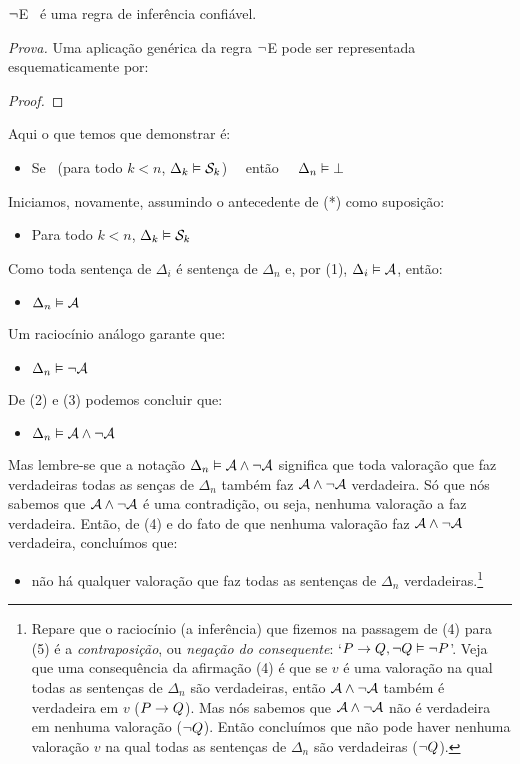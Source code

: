 \begin{factoidboxe}
	$\neg$E \ é uma regra de inferência confiável.
\end{factoidboxe}
\noindent\emph{Prova.}
Uma aplicação genérica da regra $\neg$E pode ser representada esquematicamente por:
\begin{proof}
\end{proof}\noindent
Aqui o que temos que demonstrar é:
\begin{itemize}
	\item[(*)]  Se  \ ({para todo}  $k<n$, $\Delta_k \vDash \mathcal{S}_k$) \ \ então \ \ $\Delta_n \vDash \bot$
\end{itemize}
Iniciamos, novamente, assumindo o antecedente de (*) como suposição:
\begin{itemize}
	\item[(1)] Para todo  $k<n$, $\Delta_k \vDash \mathcal{S}_k$
\end{itemize}
Como toda sentença de $\Delta_i$ é sentença de $\Delta_n$ e, por (1), $\Delta_i \vDash \mathcal{A}$, então:
\begin{itemize}
	\item[(2)] $\Delta_n \vDash \mathcal{A}$
\end{itemize}
Um raciocínio análogo garante que:
\begin{itemize}
	\item[(3)]  $\Delta_n \vDash \neg\mathcal{A}$
\end{itemize}
De (2) e (3) podemos concluir que:
\begin{itemize}
	\item[(4)]  $\Delta_n \vDash \mathcal{A} \wedge \neg\mathcal{A}$ 
\end{itemize}
Mas lembre-se que a notação $\Delta_n \vDash \mathcal{A} \wedge \neg\mathcal{A}$ significa que toda valoração que faz verdadeiras todas as senças de $\Delta_n$ também faz $\mathcal{A} \wedge \neg\mathcal{A}$ verdadeira.
Só que nós sabemos que $\mathcal{A} \wedge \neg\mathcal{A}$ é uma contradição, ou seja, nenhuma valoração a faz verdadeira. Então, de (4) e do fato de que nenhuma valoração faz $\mathcal{A} \wedge \neg\mathcal{A}$ verdadeira, concluímos que:
\begin{itemize}
	\item[(5)] não há qualquer valoração que faz todas as sentenças de  $\Delta_n$ verdadeiras.\footnote{
		Repare que o raciocínio (a inferência) que fizemos na passagem de (4) para (5) é a \textit{contraposição}, ou \textit{negação do consequente}: `$P \rightarrow Q, \neg Q \vDash \neg P$'.
		Veja que uma consequência da afirmação (4) é que se $v$ é uma valoração na qual todas as sentenças de $\Delta_n$ são verdadeiras, então  $\mathcal{A} \wedge \neg\mathcal{A}$ também é verdadeira em $v$ ($P \rightarrow Q$).
		Mas nós sabemos que $\mathcal{A} \wedge \neg\mathcal{A}$ não é verdadeira em nenhuma valoração ($\neg Q$).
		Então concluímos que não pode haver nenhuma valoração $v$ na qual todas as sentenças de $\Delta_n$ são verdadeiras ($\neg Q$).}
\end{itemize}
